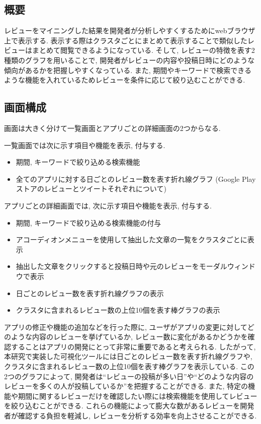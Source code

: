 \subsection{概要}
レビューをマイニングした結果を開発者が分析しやすくするためにwebブラウザ上で表示する. 表示する際はクラスタごとにまとめて表示することで類似したレビューはまとめて閲覧できるようになっている. 
そして, レビューの特徴を表す2種類のグラフを用いることで, 開発者がレビューの内容や投稿日時にどのような傾向があるかを把握しやすくなっている. また, 期間やキーワードで検索できるような機能を入れているためレビューを条件に応じて絞り込むことができる. 

\subsection{画面構成}
画面は大きく分けて一覧画面とアプリごとの詳細画面の2つからなる. 

一覧画面では次に示す項目や機能を表示, 付与する. 

\begin{itemize}
  \item 期間, キーワードで絞り込める検索機能
  \item 全てのアプリに対する日ごとのレビュー数を表す折れ線グラフ (Google Playストアのレビューとツイートそれぞれについて)
\end{itemize}

アプリごとの詳細画面では, 次に示す項目や機能を表示, 付与する.

\begin{itemize}
  \item 期間, キーワードで絞り込める検索機能の付与
  \item アコーディオンメニューを使用して抽出した文章の一覧をクラスタごとに表示
  \item 抽出した文章をクリックすると投稿日時や元のレビューをモーダルウィンドウで表示
  \item 日ごとのレビュー数を表す折れ線グラフの表示
  \item クラスタに含まれるレビュー数の上位10個を表す棒グラフの表示
\end{itemize}

アプリの修正や機能の追加などを行った際に, ユーザがアプリの変更に対してどのような内容のレビューを挙げているか, レビュー数に変化があるかどうかを確認することはアプリの開発にとって非常に重要であると考えられる. 
したがって, 本研究で実装した可視化ツールには日ごとのレビュー数を表す折れ線グラフや, クラスタに含まれるレビュー数の上位10個を表す棒グラフを表示している. 
この2つのグラフによって, 開発者は``レビューの投稿が多い日''や``どのような内容のレビューを多くの人が投稿しているか''を把握することができる. 
また, 特定の機能や期間に関するレビューだけを確認したい際には検索機能を使用してレビューを絞り込むことができる. 
これらの機能によって膨大な数があるレビューを開発者が確認する負担を軽減し, レビューを分析する効率を向上させることができる. 

